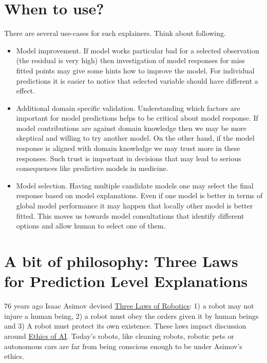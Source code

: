 \documentclass[]{book}
\providecommand{\tightlist}{%
  \setlength{\itemsep}{0pt}\setlength{\parskip}{0pt}}
\theoremstyle{definition}
\theoremstyle{definition}
\theoremstyle{definition}
\theoremstyle{remark}
\begin{document}
\hypertarget{when-to-use}{%
\section{When to use?}\label{when-to-use}}

There are several use-cases for such explainers. Think about following.

\begin{itemize}
\tightlist
\item
  Model improvement. If model works particular bad for a selected
  observation (the residual is very high) then investigation of model
  responses for miss fitted points may give some hints how to improve
  the model. For individual predictions it is easier to notice that
  selected variable should have different a effect.
\item
  Additional domain specific validation. Understanding which factors are
  important for model predictions helps to be critical about model
  response. If model contributions are against domain knowledge then we
  may be more skeptical and willing to try another model. On the other
  hand, if the model response is aligned with domain knowledge we may
  trust more in these responses. Such trust is important in decisions
  that may lead to serious consequences like predictive models in
  medicine.
\item
  Model selection. Having multiple candidate models one may select the
  final response based on model explanations. Even if one model is
  better in terms of global model performance it may happen that locally
  other model is better fitted. This moves us towards model
  consultations that identify different options and allow human to
  select one of them.
\end{itemize}

\hypertarget{three-single-laws}{%
\section{A bit of philosophy: Three Laws for Prediction Level
Explanations}\label{three-single-laws}}

76 years ago Isaac Asimov devised
\href{https://en.wikipedia.org/wiki/Three_Laws_of_Robotics}{Three Laws
of Robotics}: 1) a robot may not injure a human being, 2) a robot must
obey the orders given it by human beings and 3) A robot must protect its
own existence. These laws impact discussion around
\href{https://en.wikipedia.org/wiki/Ethics_of_artificial_intelligence}{Ethics
of AI}. Today's robots, like cleaning robots, robotic pets or autonomous
cars are far from being conscious enough to be under Asimov's ethics.
\end{document}

